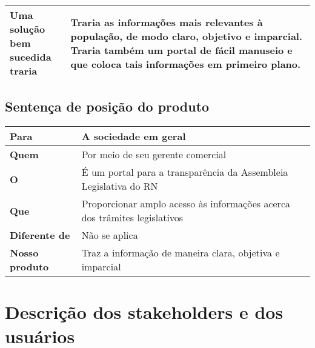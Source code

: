 \documentclass[12pt, a4paper]{article}
\begin{document}
\begin{tabu}{X[1] | X[3]}
                \textbf{Uma solução bem \newline sucedida traria} &
                Traria as informações mais relevantes à população, de modo
                claro, objetivo e imparcial. Traria também um portal de fácil
                manuseio e que coloca tais informações em primeiro plano.
                \\ \hline

            \end{tabu}

        \subsection{Sentença de posição do produto}
            \begin{tabu}{X[1] | X[3]}
                \hline
                \textbf{Para} &
                A sociedade em geral
                \\ \hline
                \textbf{Quem} &
                Por meio de seu gerente comercial
                \\ \hline
                \textbf{O} &
                É um portal para a transparência da Assembleia Legislativa do RN
                \\ \hline
                \textbf{Que} &
                Proporcionar amplo acesso às informações acerca dos trâmites
                legislativos
                \\ \hline
                \textbf{Diferente de} &
                Não se aplica
                \\ \hline
                \textbf{Nosso produto} &
                Traz a informação de maneira clara, objetiva e imparcial
                \\ \hline
            \end{tabu}

    \section{Descrição dos stakeholders e dos usuários}
\end{document}
